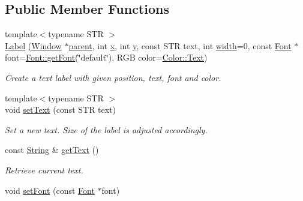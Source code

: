 \subsection*{Public Member Functions}
\begin{DoxyCompactItemize}
\item 
{\footnotesize template$<$typename S\-T\-R $>$ }\\\hyperlink{classGUI_1_1Label_af2c6be489755244854911c2c5d3b2ee2}{Label} (\hyperlink{classGUI_1_1Window}{Window} $\ast$\hyperlink{classGUI_1_1Window_a2e593ff65e7702178d82fe9010a0b539}{parent}, int \hyperlink{classGUI_1_1Window_a6ca6a80ca00c9e1d8ceea8d3d99a657d}{x}, int \hyperlink{classGUI_1_1Window_a0ee8e923aff2c3661fc2e17656d37adf}{y}, const S\-T\-R text, int \hyperlink{classGUI_1_1Window_a6cd42974c2b9239d05dac79d284f427d}{width}=0, const \hyperlink{classGUI_1_1Font}{Font} $\ast$font=\hyperlink{classGUI_1_1Font_a19c023d747809a4cfa6142d33bdff53a}{Font\-::get\-Font}(\char`\"{}default\char`\"{}), R\-G\-B color=\hyperlink{namespaceGUI_1_1Color_a03dba52f1c021d6f5a95ffee044dd839}{Color\-::\-Text})
\begin{DoxyCompactList}\small\item\em Create a text label with given position, {\ttfamily text}, {\ttfamily font} and {\ttfamily color}. \end{DoxyCompactList}\item 
\hypertarget{classGUI_1_1Label_ad1bb58bbc311c6f5b6b7097420ebb26f}{{\footnotesize template$<$typename S\-T\-R $>$ }\\void \hyperlink{classGUI_1_1Label_ad1bb58bbc311c6f5b6b7097420ebb26f}{set\-Text} (const S\-T\-R text)}\label{classGUI_1_1Label_ad1bb58bbc311c6f5b6b7097420ebb26f}

\begin{DoxyCompactList}\small\item\em Set a new text. Size of the label is adjusted accordingly. \end{DoxyCompactList}\item 
\hypertarget{classGUI_1_1Label_afe0e2c57031f0f097d5d0858566496bd}{const \hyperlink{classGUI_1_1String}{String} \& \hyperlink{classGUI_1_1Label_afe0e2c57031f0f097d5d0858566496bd}{get\-Text} ()}\label{classGUI_1_1Label_afe0e2c57031f0f097d5d0858566496bd}

\begin{DoxyCompactList}\small\item\em Retrieve current text. \end{DoxyCompactList}\item 
\hypertarget{classGUI_1_1Label_af2b43f2ac3476dd270f2d15845d75d0c}{void \hyperlink{classGUI_1_1Label_af2b43f2ac3476dd270f2d15845d75d0c}{set\-Font} (const \hyperlink{classGUI_1_1Font}{Font} $\ast$font)}\label{classGUI_1_1Label_af2b43f2ac3476dd270f2d15845d75d0c}


\end{DoxyCompactItemize}
